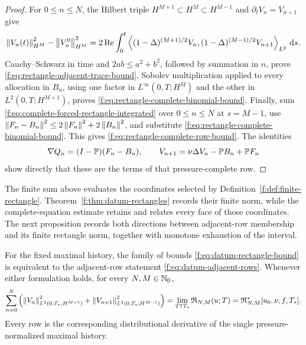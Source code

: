 \begin{proof}
For \(0\le n\le N\), the Hilbert triple
\(H^{M+1}\subset H^M\subset H^{M-1}\) and
\(\partial_tV_n=V_{n+1}\) give
\[
 \left\lVert V_n(t)\right\rVert_{H^M}^2-\left\lVert V_n^0\right\rVert_{H^M}^2
 =2\operatorname{Re}\int_0^t
 \left\langle (1-\Delta)^{(M+1)/2}V_n,(1-\Delta)^{(M-1)/2}V_{n+1}\right\rangle_{L^2}\,\mathrm d s.
\]
Cauchy--Schwarz in time and \(2ab\le a^2+b^2\), followed by summation in
\(n\), prove \eqref{f:eq:rectangle-adjacent-trace-bound}.  Sobolev
multiplication applied to every allocation in \(B_n\), using one factor in
\(L^\infty(0,T;H^M)\) and the other in
\(L^2(0,T;H^{M+1})\), proves
\eqref{f:eq:rectangle-complete-binomial-bound}.  Finally, sum
\eqref{f:eq:complete-forced-rectangle-integrated} over \(0\le n\le N\) at
\(s=M-1\), use
\(\left\lVert F_n-B_n\right\rVert^2\le2\left\lVert F_n\right\rVert^2+2\left\lVert B_n\right\rVert^2\), and substitute
\eqref{f:eq:rectangle-complete-binomial-bound}.  This gives
\eqref{f:eq:rectangle-complete-row-bound}.  The identities
\[
 \nabla Q_n=(I-\mathbb P)(F_n-B_n),
 \qquad
 V_{n+1}=\nu\Delta V_n-\mathbb P B_n+\mathbb P F_n
\]
show directly that these are the terms of that pressure-complete row.
\end{proof}

The finite sum above evaluates the coordinates selected by
Definition~\ref{f:def:finite-rectangle}.  Theorem~\ref{f:thm:datum-rectangles}
records their finite norm, while the complete-equation estimate retains and
relates every face of those coordinates.  The next proposition records both
directions between adjacent-row membership and its finite rectangle norm,
together with monotone exhaustion of the interval.

\begin{proposition}
\label{f:prop:datum-terminal-realization}

For the fixed maximal history, the family of bounds
\eqref{f:eq:datum-rectangle-bound} is equivalent to the adjacent-row statement
\eqref{f:eq:datum-adjacent-rows}.  Whenever either formulation holds, for every
\(N,M\in\mathbb N_0\),
\begin{equation}
 \sum_{n=0}^{N}\left(
 \left\lVert V_n\right\rVert_{L^2(0,T_*;H^{M+1})}^2
 +\left\lVert V_{n+1}\right\rVert_{L^2(0,T_*;H^{M-1})}^2
 \right)
 =\lim_{T\uparrow T_*}\mathfrak R_{N,M}(u;T)
 =\mathfrak R_{N,M}^*[u_0,\nu,f,T_*].
 \label{f:eq:datum-terminal-monotone-realization}
\end{equation}
Every row is the corresponding distributional derivative of the single
pressure-normalized maximal history.
\end{proposition}

